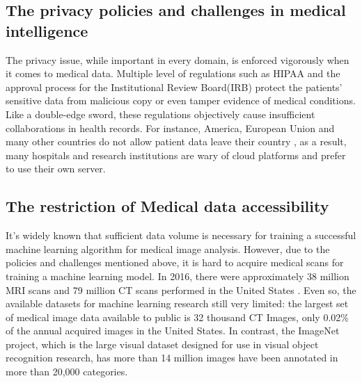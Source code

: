 \subsection{The privacy policies and challenges in medical intelligence}
The privacy issue, while important in every domain, is enforced vigorously when it comes to medical data. Multiple level of regulations such as HIPAA\cite{annas2003hipaa,centers2003hipaa,mercuri2004hipaa,gostin2009beyond} and the approval process for the Institutional Review Board(IRB) \cite{bankert2006institutional} protect the patients' sensitive data from malicious copy or even tamper evidence of medical conditions. Like a double-edge sword, these regulations objectively cause insufficient collaborations in health records.
For instance, America, European Union and many other countries do not allow patient data leave their country \cite{kerikmae2017challenges,seddon2013cloud}, as a result, many hospitals and research institutions are wary of cloud platforms and prefer to use their own server. 



\subsection{The restriction of Medical data accessibility}
It's widely known that sufficient data volume is necessary for training a successful machine learning algorithm \cite{domingos2012few} for medical image analysis. 
However, due to the policies and challenges mentioned above, it is hard to acquire medical scans for training a machine learning model. In 2016, there were approximately 38 million MRI scans and 79 million CT scans performed in the United States \cite{papanicolas2018health}. Even so, the available datasets for machine learning research still very limited: the largest set of medical image data available to public is 32 thousand \cite{yan2018deeplesion} CT Images, only 0.02\% of the annual acquired images in the United States.
In contrast, the ImageNet \cite{deng2009imagenet} project, which is the large visual dataset designed for use in visual object recognition research, has more than 14 million images have been annotated in more than 20,000 categories.
